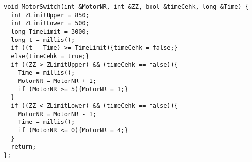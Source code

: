 \begin{lstlisting}[frame=single,language=Arduino] 
void MotorSwitch(int &MotorNR, int &ZZ, bool &timeCehk, long &Time) {
  int ZLimitUpper = 850;
  int ZLimitLower = 500;
  long TimeLimit = 3000;
  long t = millis();
  if ((t - Time) >= TimeLimit){timeCehk = false;}
  else{timeCehk = true;}
  if ((ZZ > ZLimitUpper) && (timeCehk == false)){
    Time = millis();
    MotorNR = MotorNR + 1;
    if (MotorNR >= 5){MotorNR = 1;}
  }
  if ((ZZ < ZLimitLower) && (timeCehk == false)){
    MotorNR = MotorNR - 1;
    Time = millis();
    if (MotorNR <= 0){MotorNR = 4;}
  }
  return;
};
\end{lstlisting}